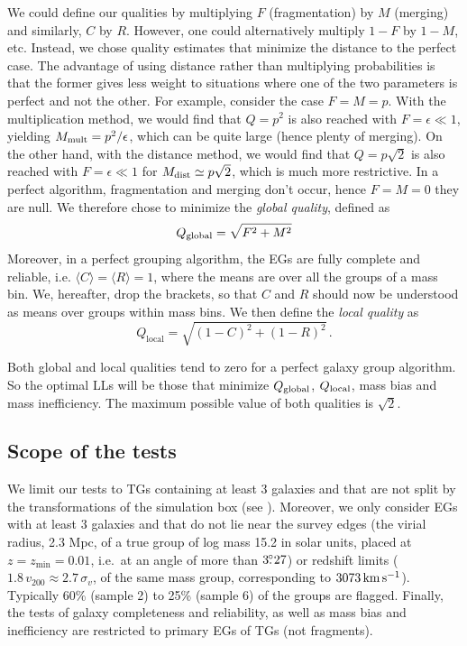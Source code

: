 We could define our qualities by multiplying $F$ (fragmentation) by $M$
(merging) and similarly, $C$ by $R$. However, one could alternatively multiply
$1-F$ by $1-M$, etc. Instead, we chose quality estimates that minimize the
distance to the perfect case. The advantage of using distance rather than
multiplying probabilities is that the former gives less weight to situations
where one of the two parameters is perfect and not the other. For example,
consider the case $F=M=p$. With the multiplication method, we would find that
$Q=p^2$ is also reached with $F=\epsilon\ll 1$, yielding $M_{\rm
mult}=p^2/\epsilon$, which can be quite large (hence plenty of merging). On the
other hand, with the distance method, we would find that $Q=p\sqrt{2}$ is also
reached with $F=\epsilon\ll1$ for $M_{\rm dist}\simeq p\sqrt{2}$, which is much
more restrictive. In a perfect algorithm, fragmentation and merging don't
occur, hence $F=M=0$ they are null. We therefore chose to minimize the
\emph{global quality}, defined as
%
\begin{equation}
    Q_{\rm global} = \sqrt{F^2+M^2}
\end{equation}
%
Moreover, in a perfect grouping algorithm, the EGs are fully complete and
reliable, i.e. $\langle C\rangle=\langle R\rangle=1$, where the means are over
all the groups of a mass bin. We, hereafter, drop the brackets, so that $C$ and
$R$ should now be understood as means over groups within mass bins. We then
define the \emph{local quality} as
%
\begin{equation}
    Q_{\mathrm{local}}=\sqrt{{\left(1-
    C\right)}^2+{\left(1- R\right)}^2} \,.
\end{equation}

Both global and local qualities tend to zero for a perfect galaxy group
algorithm. So the optimal LLs will be those that minimize $Q_{\rm global}$,
$Q_{\rm local}$, mass bias and mass inefficiency. The maximum possible value of
both qualities is $\sqrt{2}$.

\subsection{Scope of the tests}

We limit our tests to TGs containing at least 3 galaxies and that are not split
by the transformations of the simulation box (see ).
Moreover, we only consider EGs with at least 3 galaxies and that do not lie
near the survey edges (the virial radius, 2.3 Mpc, of a true group of log mass
15.2 in solar units, placed at $z=z_{\min}=0.01$, i.e.\ at an angle of more
than $3\hbox{$.\!\!^\circ$}27$) or redshift limits ($1.8\,v_{200} \approx 2.7 \,\sigma_v$, of
the same mass group, corresponding to $3073 \, \rm km \, s^{-1}$). Typically
60\% (sample 2) to 25\% (sample 6) of the groups are flagged. Finally, the
tests of galaxy completeness and reliability, as well as mass bias and
inefficiency are restricted to primary EGs of TGs (not fragments).

